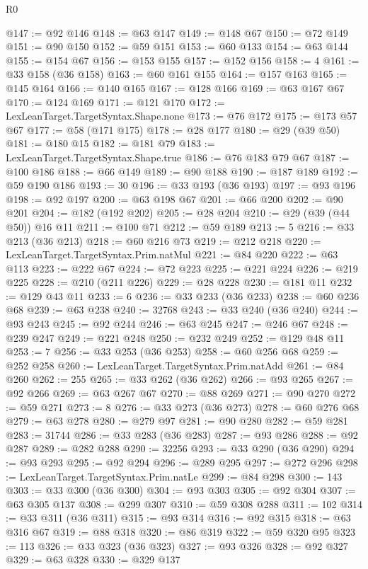\begin{lexlean}{R0}
\begin{coremodule}
@147 := @92 @146
@148 := @63 @147
@149 := @148 @67
@150 := @72 @149
@151 := @90 @150
@152 := @59 @151
@153 := @60 @133
@154 := @63 @144
@155 := @154 @67
@156 := @153 @155
@157 := @152 @156
@158 := 4
@161 := @33 @158 (@36 @158)
@163 := @60 @161 @155
@164 := @157 @163
@165 := @145 @164
@166 := @140 @165
@167 := @128 @166
@169 := @63 @167 @67
@170 := @124 @169
@171 := @121 @170
@172 := LexLeanTarget.TargetSyntax.Shape.none
@173 := @76 @172
@175 := @173 @57 @67
@177 := @58 (@171 @175)
@178 := @28 @177
@180 := @29 (@39 @50)
@181 := @180 @15
@182 := @181 @79
@183 := LexLeanTarget.TargetSyntax.Shape.true
@186 := @76 @183 @79 @67
@187 := @100 @186
@188 := @66 @149
@189 := @90 @188
@190 := @187 @189
@192 := @59 @190 @186
@193 := 30
@196 := @33 @193 (@36 @193)
@197 := @93 @196
@198 := @92 @197
@200 := @63 @198 @67
@201 := @66 @200
@202 := @90 @201
@204 := @182 (@192 @202)
@205 := @28 @204
@210 := @29 (@39 (@44 @50)) @16 @11
@211 := @100 @71
@212 := @59 @189
@213 := 5
@216 := @33 @213 (@36 @213)
@218 := @60 @216 @73
@219 := @212 @218
@220 := LexLeanTarget.TargetSyntax.Prim.natMul
@221 := @84 @220
@222 := @63 @113
@223 := @222 @67
@224 := @72 @223
@225 := @221 @224
@226 := @219 @225
@228 := @210 (@211 @226)
@229 := @28 @228
@230 := @181 @11
@232 := @129 @43 @11
@233 := 6
@236 := @33 @233 (@36 @233)
@238 := @60 @236 @68
@239 := @63 @238
@240 := 32768
@243 := @33 @240 (@36 @240)
@244 := @93 @243
@245 := @92 @244
@246 := @63 @245
@247 := @246 @67
@248 := @239 @247
@249 := @221 @248
@250 := @232 @249
@252 := @129 @48 @11
@253 := 7
@256 := @33 @253 (@36 @253)
@258 := @60 @256 @68
@259 := @252 @258
@260 := LexLeanTarget.TargetSyntax.Prim.natAdd
@261 := @84 @260
@262 := 255
@265 := @33 @262 (@36 @262)
@266 := @93 @265
@267 := @92 @266
@269 := @63 @267 @67
@270 := @88 @269
@271 := @90 @270
@272 := @59 @271
@273 := 8
@276 := @33 @273 (@36 @273)
@278 := @60 @276 @68
@279 := @63 @278
@280 := @279 @97
@281 := @90 @280
@282 := @59 @281
@283 := 31744
@286 := @33 @283 (@36 @283)
@287 := @93 @286
@288 := @92 @287
@289 := @282 @288
@290 := 32256
@293 := @33 @290 (@36 @290)
@294 := @93 @293
@295 := @92 @294
@296 := @289 @295
@297 := @272 @296
@298 := LexLeanTarget.TargetSyntax.Prim.natLe
@299 := @84 @298
@300 := 143
@303 := @33 @300 (@36 @300)
@304 := @93 @303
@305 := @92 @304
@307 := @63 @305 @137
@308 := @299 @307
@310 := @59 @308 @288
@311 := 102
@314 := @33 @311 (@36 @311)
@315 := @93 @314
@316 := @92 @315
@318 := @63 @316 @67
@319 := @88 @318
@320 := @86 @319
@322 := @59 @320 @95
@323 := 113
@326 := @33 @323 (@36 @323)
@327 := @93 @326
@328 := @92 @327
@329 := @63 @328
@330 := @329 @137

\end{coremodule}
\end{lexlean}
